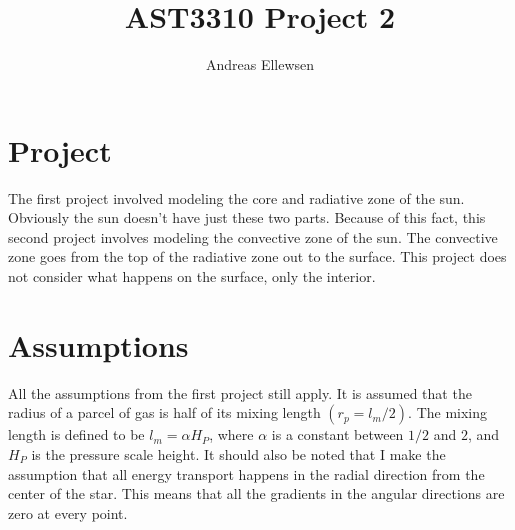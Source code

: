 \documentclass[a4paper,12pt]{article}
\title{AST3310 Project 2}
\author{Andreas Ellewsen}
\begin{document}
\maketitle
\tableofcontents
\newpage
\section{Project}
The first project involved modeling the core and radiative zone of the sun. 
Obviously the sun doesn't have just these two parts.
Because of this fact, this second project involves modeling the convective zone of the sun.
The convective zone goes from the top of the radiative zone out to the surface.
This project does not consider what happens on the surface, only the interior.

\section{Assumptions}
All the assumptions from the first project still apply.
It is assumed that the radius of a parcel of gas is half of its mixing length $(r_p = l_m/2)$.
The mixing length is defined to be $l_m = \alpha H_P$, where $\alpha$ is a constant between $1/2$ and $2$, and $H_P$ is the pressure scale height.
It should also be noted that I make the assumption that all energy transport happens in the radial direction from the center of the star. 
This means that all the gradients in the angular directions are zero at every point.
\end{document}
